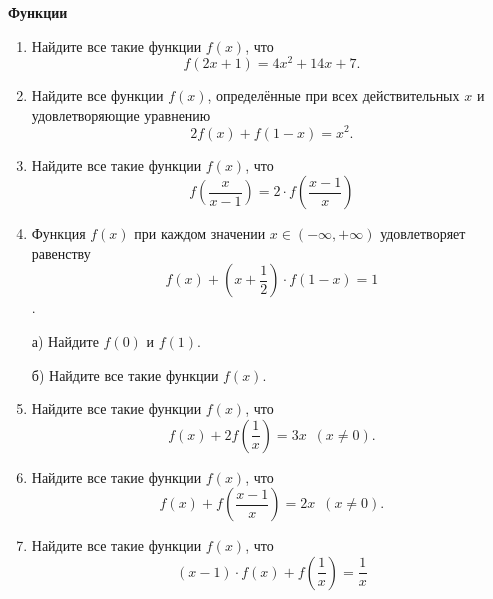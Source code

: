 \documentclass{article}
\begin{document}
\large
	

\begin{center}
\textbf{Функции}
\end{center}

\begin{enumerate}[label*=\protect\fbox{\arabic{enumi}}]
	
\item Найдите все такие функции $f(x)$, что $$f(2x+1) = 4x^2 +14x+7.$$

\item Найдите все функции $f(x)$, определённые при всех действительных $x$ и удовлетворяющие уравнению
$$2f(x) + f(1 - x) = x^2.$$

\item Найдите все такие функции $f(x)$, что $$f\left(\frac{x}{x-1}\right) = 2 \cdot f\left(\frac{x-1}{x}\right)$$

\item Функция $f(x)$ при каждом значении $x \in (-\infty,+\infty)$ удовлетворяет равенству
$$f(x)+ \left( x+\frac{1}{2}\right) \cdot f(1-x)=1$$.

а) Найдите $f(0)$ и $f(1)$.

б) Найдите все такие функции $f(x)$.

\item Найдите все такие функции $f(x)$, что $$f(x)+2f\left(\frac{1}{x}\right) =3x \,\,\, (x \neq 0).$$

\item Найдите все такие функции $f(x)$, что $$f(x) + f\left(\frac{x - 1}{x}\right) = 2x \,\,\, (x \neq  0).$$

\item Найдите все такие функции $f(x)$, что $$(x - 1) \cdot f(x) + f\left(\frac{1}{x}\right) = \frac{1}{x} $$

\end{enumerate}
\end{document}
